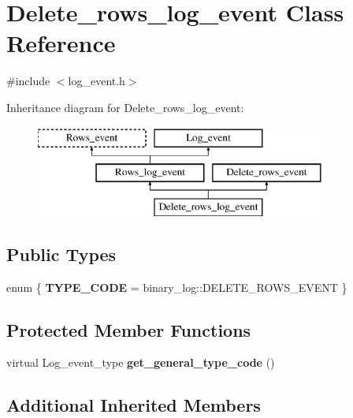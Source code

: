 \hypertarget{classDelete__rows__log__event}{}\section{Delete\+\_\+rows\+\_\+log\+\_\+event Class Reference}
\label{classDelete__rows__log__event}


{\ttfamily \#include $<$log\+\_\+event.\+h$>$}

Inheritance diagram for Delete\+\_\+rows\+\_\+log\+\_\+event\+:\begin{figure}[H]
\begin{center}
\leavevmode
\includegraphics[height=3.000000cm]{classDelete__rows__log__event}
\end{center}
\end{figure}
\subsection*{Public Types}
\begin{DoxyCompactItemize}
\item 
\mbox{\label{classDelete__rows__log__event_a9b760629eb9a3c7f5326278f7b76fc6f}} 
enum \{ {\bfseries T\+Y\+P\+E\+\_\+\+C\+O\+DE} = binary\+\_\+log\+:\+:D\+E\+L\+E\+T\+E\+\_\+\+R\+O\+W\+S\+\_\+\+E\+V\+E\+NT
 \}
\end{DoxyCompactItemize}
\subsection*{Protected Member Functions}
\begin{DoxyCompactItemize}
\item 
\mbox{\label{classDelete__rows__log__event_acf537554b1dbc23ede8dfef382bf026e}} 
virtual Log\+\_\+event\+\_\+type {\bfseries get\+\_\+general\+\_\+type\+\_\+code} ()
\end{DoxyCompactItemize}
\subsection*{Additional Inherited Members}



